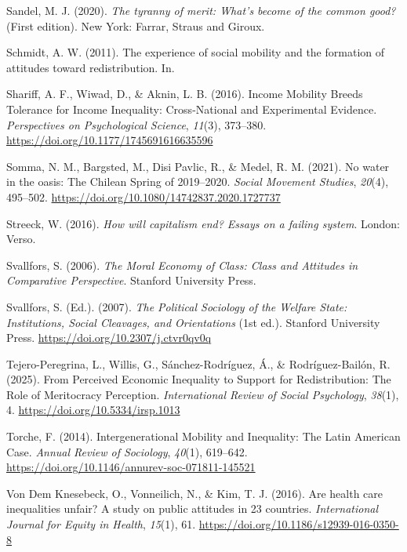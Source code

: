\documentclass[
  12pt,
]{article}
\newlength{\cslhangindent}
\newenvironment{CSLReferences}[2] %
 {\begin{list}{}{%
  \setlength{\itemindent}{0pt}
  \setlength{\leftmargin}{0pt}
  \setlength{\parsep}{0pt}
  \ifodd #1
   \setlength{\leftmargin}{\cslhangindent}
   \setlength{\itemindent}{-1\cslhangindent}
  \fi
  \setlength{\itemsep}{#2\baselineskip}}}
 {\end{list}}
\begin{document}
\begin{CSLReferences}{1}{0}
Sandel, M. J. (2020). \emph{The tyranny of merit: {What}'s become of the
common good?} (First edition). New York: {Farrar, Straus and Giroux}.

Schmidt, A. W. (2011). The experience of social mobility and the
formation of attitudes toward redistribution. In.

Shariff, A. F., Wiwad, D., \& Aknin, L. B. (2016). Income {Mobility
Breeds Tolerance} for {Income Inequality}: {Cross-National} and
{Experimental Evidence}. \emph{Perspectives on Psychological Science},
\emph{11}(3), 373--380. \url{https://doi.org/10.1177/1745691616635596}

Somma, N. M., Bargsted, M., Disi Pavlic, R., \& Medel, R. M. (2021). No
water in the oasis: The {Chilean Spring} of 2019--2020. \emph{Social
Movement Studies}, \emph{20}(4), 495--502.
\url{https://doi.org/10.1080/14742837.2020.1727737}

Streeck, W. (2016). \emph{How will capitalism end? Essays on a failing
system}. London: Verso.

Svallfors, S. (2006). \emph{The {Moral Economy} of {Class}: {Class} and
{Attitudes} in {Comparative Perspective}}. Stanford University Press.

Svallfors, S. (Ed.). (2007). \emph{The {Political Sociology} of the
{Welfare State}: {Institutions}, {Social Cleavages}, and {Orientations}}
(1st ed.). Stanford University Press.
\url{https://doi.org/10.2307/j.ctvr0qv0q}

Tejero-Peregrina, L., Willis, G., Sánchez-Rodríguez, Á., \&
Rodríguez-Bailón, R. (2025). From {Perceived Economic Inequality} to
{Support} for {Redistribution}: {The Role} of {Meritocracy Perception}.
\emph{International Review of Social Psychology}, \emph{38}(1), 4.
\url{https://doi.org/10.5334/irsp.1013}

Torche, F. (2014). Intergenerational {Mobility} and {Inequality}: {The
Latin American Case}. \emph{Annual Review of Sociology}, \emph{40}(1),
619--642. \url{https://doi.org/10.1146/annurev-soc-071811-145521}

Von Dem Knesebeck, O., Vonneilich, N., \& Kim, T. J. (2016). Are health
care inequalities unfair? {A} study on public attitudes in 23 countries.
\emph{International Journal for Equity in Health}, \emph{15}(1), 61.
\url{https://doi.org/10.1186/s12939-016-0350-8}


\end{CSLReferences}
\end{document}

